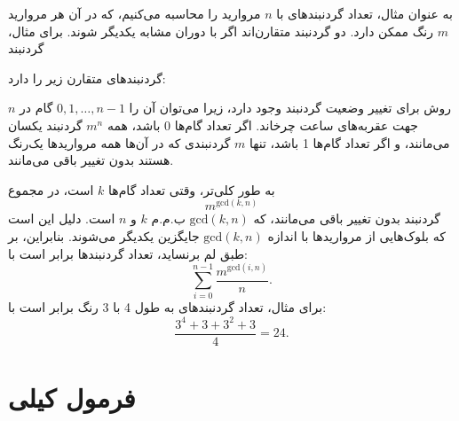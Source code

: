 به عنوان مثال، تعداد گردنبندهای با $n$ مروارید را محاسبه می‌کنیم، که در آن هر مروارید $m$ رنگ ممکن دارد. دو گردنبند متقارن‌اند اگر با دوران مشابه یکدیگر شوند.
برای مثال، گردنبند
\begin{center}
\end{center}
گردنبندهای متقارن زیر را دارد:
\begin{center}
\end{center}
$n$ روش برای تغییر وضعیت گردنبند وجود دارد، زیرا می‌توان آن را $0,1,\ldots,n-1$ گام در جهت عقربه‌های ساعت چرخاند.
اگر تعداد گام‌ها 0 باشد، همه $m^n$ گردنبند یکسان می‌مانند، و اگر تعداد گام‌ها 1 باشد، تنها $m$ گردنبندی که در آن‌ها همه مرواریدها یک‌رنگ هستند بدون تغییر باقی می‌مانند.

به طور کلی‌تر، وقتی تعداد گام‌ها $k$ است، در مجموع
\[m^{\textrm{gcd}(k,n)}\]
گردنبند بدون تغییر باقی می‌مانند، که $\textrm{gcd}(k,n)$ ب.م.م $k$ و $n$ است.
دلیل این است که بلوک‌هایی از مرواریدها با اندازه $\textrm{gcd}(k,n)$ جایگزین یکدیگر می‌شوند.
بنابراین، بر طبق لم برنساید، تعداد گردنبندها برابر است با:
\[\sum_{i=0}^{n-1} \frac{m^{\textrm{gcd}(i,n)}}{n}. \]
برای مثال، تعداد گردنبندهای به طول 4 با 3 رنگ برابر است با:
\[\frac{3^4+3+3^2+3}{4} = 24. \]

\section{فرمول کیلی}

